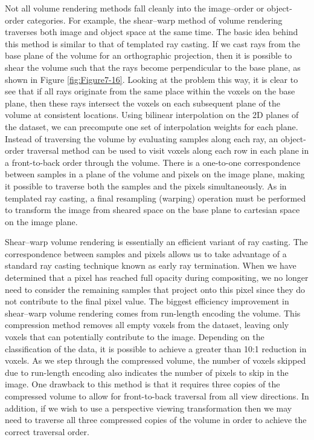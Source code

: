 Not all volume rendering methods fall cleanly into the image--order or object-order categories. For example, the shear--warp method \cite{Lacroute94} of volume rendering traverses both image and object space at the same time. The basic idea behind this method is similar to that of templated ray casting. If we cast rays from the base plane of the volume for an orthographic projection, then it is possible to shear the volume such that the rays become perpendicular to the base plane, as shown in Figure \ref{fig:Figure7-16}. Looking at the problem this way, it is clear to see that if all rays originate from the same place within the voxels on the base plane, then these rays intersect the voxels on each subsequent plane of the volume at consistent locations. Using bilinear interpolation on the 2D planes of the dataset, we can precompute one set of interpolation weights for each plane. Instead of traversing the volume by evaluating samples along each ray, an object-order traversal method can be used to visit voxels along each row in each plane in a front-to-back order through the volume. There is a one-to-one correspondence between samples in a plane of the volume and pixels on the image plane, making it possible to traverse both the samples and the pixels simultaneously. As in templated ray casting, a final resampling (warping) operation must be performed to transform the image from sheared space on the base plane to cartesian space on the image plane.

Shear--warp volume rendering is essentially an efficient variant of ray casting. The correspondence between samples and pixels allows us to take advantage of a standard ray casting technique known as early ray termination. When we have determined that a pixel has reached full opacity during compositing, we no longer need to consider the remaining samples that project onto this pixel since they do not contribute to the final pixel value. The biggest efficiency improvement in shear--warp volume rendering comes from run-length encoding the volume. This compression method removes all empty voxels from the dataset, leaving only voxels that can potentially contribute to the image. Depending on the classification of the data, it is possible to achieve a greater than 10:1 reduction in voxels. As we step through the compressed volume, the number of voxels skipped due to run-length encoding also indicates the number of pixels to skip in the image. One drawback to this method is that it requires three copies of the compressed volume to allow for front-to-back traversal from all view directions. In addition, if we wish to use a perspective viewing transformation then we may need to traverse all three compressed copies of the volume in order to achieve the correct traversal order.

